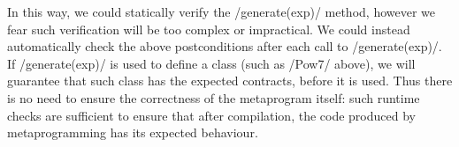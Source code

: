 \vspace{-1ex}
In this way, we could statically verify the /generate(exp)/ method, however we fear such verification will be too complex or impractical. 
We could instead automatically check the above postconditions after each call to /generate(exp)/. If /generate(exp)/ is used to define a class (such as /Pow7/ above), we will guarantee that such class has the expected contracts, before it is used. Thus
there is no need to ensure the correctness of the metaprogram itself: such runtime checks are sufficient to ensure that after compilation, the code produced by metaprogramming has its expected behaviour.


